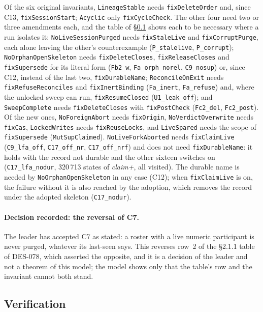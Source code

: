 \documentclass[a4paper,10pt,fleqn]{article}
\newcommand{\field}[1]{\texttt{#1}}
\begin{document}
Of the six original invariants, \field{LineageStable} needs
\field{fixDeleteOrder} and, since C13, \field{fixSessionStart}; \field{Acyclic}
only \field{fixCycleCheck}. The other four need two or three amendments each,
and the table of \S\ref{sec:lc-verification} shows each to be necessary where
a run isolates it: \field{NoLiveSessionPurged} needs \field{fixStaleLive} and
\field{fixCorruptPurge}, each alone leaving the other's counterexample
(\texttt{P\_stalelive}, \texttt{P\_corrupt});
\field{NoOrphanOpenSkeleton} needs \field{fixDeleteCloses},
\field{fixReleaseCloses} and \field{fixSupersede} for its literal form
(\texttt{Fb2\_w}, \texttt{Fa\_orph\_norel}, \texttt{C9\_nosup}) or, since C12,
instead of the last two, \field{fixDurableName};
\field{ReconcileOnExit} needs \field{fixRefuseReconciles} and
\field{fixInertBinding} (\texttt{Fa\_inert}, \texttt{Fa\_refuse}) and, where the
unlocked sweep can run, \field{fixResumeClosed} (\texttt{U1\_leak\_off}); and
\field{SweepComplete} needs \field{fixDeleteCloses} with \field{fixPostCheck}
(\texttt{Fc2\_del}, \texttt{Fc2\_post}). Of the new ones, \field{NoForeignAbort}
needs \field{fixOrigin}, \field{NoVerdictOverwrite} needs \field{fixCas},
\field{LockedWrites} needs \field{fixReuseLocks}, and \field{LiveSpared}
needs the scope of \field{fixSupersede} (\texttt{MutSupClaimed}).
\field{NoLiveForkAborted} needs \field{fixClaimLive} (\texttt{C9\_lfa\_off},
\texttt{C17\_off\_nr}, \texttt{C17\_off\_nrf}) and does not need \field{fixDurableName}: it holds with
the record not durable and the other sixteen switches on
(\texttt{C17\_lfa\_nodur}, 320\,713 states of \emph{claim+}, all visited). The
durable name is needed by \field{NoOrphanOpenSkeleton} in any case (C12);
when \field{fixClaimLive} is on, the failure without it is also reached by
the adoption, which removes the record under the adopted skeleton
(\texttt{C17\_nodur}).

\paragraph{Decision recorded: the reversal of C7.} The leader has accepted
C7 as stated: a roster with a live numeric participant is never purged,
whatever its last-seen says. This reverses row~2 of the \S2.1.1 table of
DES-078, which asserted the opposite, and it is a decision of the leader and
not a theorem of this model; the model shows only that the table's row and the
invariant cannot both stand.

\subsection{Verification}
\label{sec:lc-verification}
\end{document}
